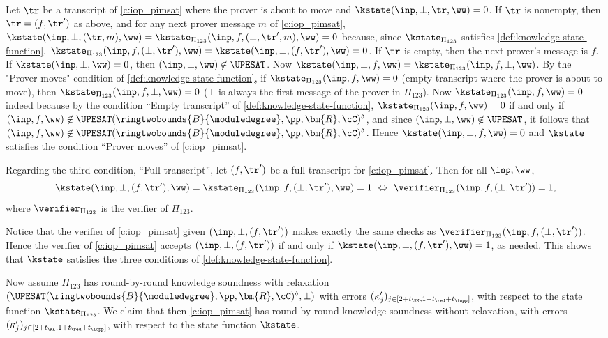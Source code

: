 Let $\tr$ be a transcript of \cref{c:iop_pimsat} where the prover is about to move and $\kstate(\inp,\bot,\tr,\ww)=0$. If $\tr$ is nonempty, then $\tr=(f,\tr')$ as above, and  for any next prover message $m$ of \cref{c:iop_pimsat}, $\kstate(\inp,\bot, (\tr, m), \ww)= \kstate_{\Pi_{123}}(\inp,f, (\bot, \tr', m),\ww)=0$ because, since $\kstate_{\Pi_{123}}$ satisfies \cref{def:knowledge-state-function}, $\kstate_{\Pi_{123}}(\inp,f, (\bot, \tr'),\ww)=\kstate(\inp,\bot, (f, \tr'),\ww)=0$. If $\tr$ is empty, then the next prover's message is $f$. If $\kstate(\inp,\bot,\ww)=0$, then $(\inp,\bot,\ww)\not\in \UPESAT$. Now $\kstate(\inp,\bot, f, \ww) = \kstate_{\Pi_{123}}(\inp, f, \bot,\ww)$. By the "Prover moves" condition of \cref{def:knowledge-state-function}, if $\kstate_{\Pi_{123}}(\inp, f,\ww)=0$ (empty transcript where the prover is about to move), then $\kstate_{\Pi_{123}}(\inp, f, \bot,\ww)=0$ ($\bot$ is always the first message of the prover in $\Pi_{123}$). Now $\kstate_{\Pi_{123}}(\inp, f,\ww)=0$ indeed because by the condition ``Empty transcript'' of \cref{def:knowledge-state-function}, $\kstate_{\Pi_{123}}(\inp, f,\ww)=0$ if and only if $(\inp, f,\ww)\not\in \UPESAT(\ringtwobounds{B}{\moduledegree}, \pp,\bm{R}, \cC)^\delta$, and since $(\inp,\bot,\ww)\not\in \UPESAT$, it follows that $(\inp, f,\ww)\not\in \UPESAT(\ringtwobounds{B}{\moduledegree}, \pp,\bm{R}, \cC)^\delta$.  Hence $\kstate(\inp,\bot, f, \ww)=0$ and $\kstate$ satisfies the condition ``Prover moves'' of \cref{c:iop_pimsat}.
 

 Regarding the third condition, ``Full transcript'', let $(f,\tr')$ be a full transcript for \cref{c:iop_pimsat}.  Then for all $\inp,\ww$,
%
$$
\kstate(\inp,\bot,(f,\tr'),\ww) = \kstate_{\Pi_{123}}(\inp,f,(\bot,\tr'), \ww) = 1 \ \Leftrightarrow \ \verifier_{\Pi_{123}}(\inp,f, (\bot,\tr'))=1, 
$$
%
where $\verifier_{\Pi_{123}}$ is the verifier of $\Pi_{123}$.

Notice that the verifier of \cref{c:iop_pimsat} given $(\inp, \bot, (f,\tr'))$ makes exactly the same checks as $\verifier_{\Pi_{123}}(\inp,f, (\bot,\tr'))$. Hence the verifier of \cref{c:iop_pimsat} accepts $(\inp, \bot, (f,\tr'))$ if and only if $\kstate(\inp,\bot,(f,\tr'),\ww) = 1$, as needed. This shows that $\kstate$ satisfies the three conditions of \cref{def:knowledge-state-function}.




Now assume $\Pi_{123}$ has round-by-round knowledge soundness with relaxation $(\UPESAT(\ringtwobounds{B}{\moduledegree}, \pp,\bm{R}, \cC)^\delta,\bot)$ with errors $(\kappa_{j}')_{j\in [2+t_\KK, 1+ t_\red +t_\iopp]}$, with respect to the state function $\kstate_{\Pi_{123}}$. We claim that then \cref{c:iop_pimsat} has round-by-round knowledge soundness without relaxation, with errors $(\kappa_{j}')_{j\in [2+t_\KK, 1+ t_\red +t_\iopp]}$, with respect to the state function $\kstate$.

